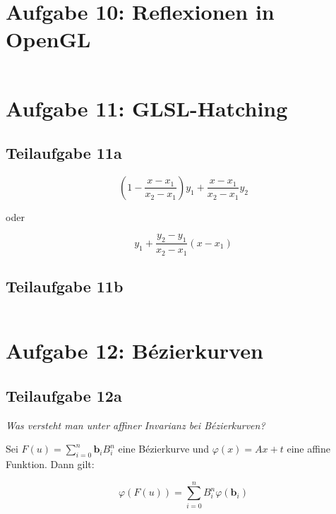 \documentclass[a4paper]{scrartcl}
\begin{document}
\section*{Aufgabe 10: Reflexionen in OpenGL}
\inputminted[linenos, numbersep=5pt, tabsize=4, frame=lines, label=shader.frag]{glsl}{shader.frag}

\section*{Aufgabe 11: GLSL-Hatching}
\subsection*{Teilaufgabe 11a}

\[
	\left(1 - \frac{x - x_1}{x_2 - x_1}\right) y_1 + \frac{x - x_1}{x_2 - x_1} y_2
\]

oder

\[
	y_1 + \frac{y_2 - y_1}{x_2 - x_1} (x - x_1)
\]

\clearpage
\subsection*{Teilaufgabe 11b}
\inputminted[linenos, numbersep=5pt, tabsize=4, frame=lines, label=shader.frag]{glsl}{hatching.frag}

\clearpage
\section*{Aufgabe 12: Bézierkurven}
\subsection*{Teilaufgabe 12a}
\textit{Was versteht man unter affiner Invarianz bei Bézierkurven?}

Sei $F(u) = \sum_{i=0}^n \mathbf{b}_i B_i^n$ eine Bézierkurve und
$\varphi(x) = A x + t$ eine affine Funktion. Dann gilt:

\[\varphi(F(u)) = \sum_{i=0}^n B_i^n \varphi(\mathbf{b}_i)\]
\end{document}
